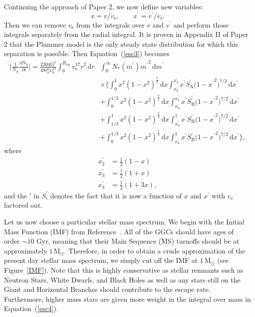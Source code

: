 \documentclass[aps,floatfix,prd,showpacs]{revtex4}
\newcommand{\diff}{\mathrm{d}}
\newcommand{\vesc}{v_{\text{e}}}
\newcommand{\vp}{v^\prime}
\newcommand{\mpr}{m^\prime}
\newcommand{\xp}{x^\prime}
\newcommand{\SA}{S_{\text{A}}}
\newcommand{\SB}{S_{\text{B}}}
\newcommand{\G}{\text{G}}
\newcommand{\Nx}{N_\chi}
\newcommand{\Rvir}{R_{\mathrm{vir}}}
\newcommand{\Msun}{\textrm{M}_\odot}
\begin{document}
Continuing the approach of Paper 2, we now define new variables: 
%
\begin{equation} 
x = v/\vesc, \qquad \xp = \vp/\vesc. 
\end{equation}
%
%
Then we can remove $\vesc$ from the integrals over $v$ and $\vp$ and perform those integrals separately from the radial integral. It is proven in Appendix II of Paper 2 that the Plummer model is the only steady state distribution for which this separation is possible. Then Equation~(\ref{esc3}) becomes
%
\begin{equation}
\label{esc4}
\begin{split}
\bigg|\frac{1}{\Nx}\frac{\partial \Nx}{\partial t}\bigg| = \frac{2304\G^2}{49 r_0^6\psi_0^{10}}\int^{\Rvir}_0{\vesc^{17}r^2}\,\diff r & \int^\infty_0{N_*(\mpr)\mpr}^2\,\diff \mpr \\& \times \Bigg\{ \int^1_0{x^2(1 - x^2)^\frac{7}{2}}\,\diff x\int^{\xp_3}_{\xp_2}{\xp \SA^\prime{(1-{\xp}^2})^{7/2}}\,\diff \xp \\
&+ \int^{1/3}_0{x^2(1 - x^2)^\frac{7}{2}}\,\diff x\int^{\xp_4}_{\xp_3} {\xp \SB^\prime{(1-{\xp}^2})^{7/2}}\,\diff \xp \\ &+ \int^1_{1/3}{x^2(1 - x^2)^\frac{7}{2}}\,\diff x\int^1_{x_3^\prime}{\xp \SB^\prime{(1-{\xp}^2})^{7/2}}\,\diff \xp \\
&+ \int^{1/3}_0{x^2(1 - {x}^2)^\frac{7}{2}}\,\diff x\int^1_{\xp_4}{\xp \SB^\prime{(1-{\xp}^2})^{7/2}}\,\diff \xp\Bigg\},
\end{split}
\end{equation}
%
%
where
%
\begin{equation}
\begin{split}
\xp_2 &= \frac{1}{2}(1 - x) \\
\xp_3 &= \frac{1}{2}(1 + x) \\
\xp_4 &= \frac{1}{2}(1 + 3x),
\end{split}
\end{equation}
%
%
and the $\prime$ in $S_i^\prime$ denotes the fact that it is now a function of $x$ and $\xp$ with $\vesc$ factored out.

Let us now choose a particular stellar mass spectrum. We begin with the Initial Mass Function (IMF) from Reference~\cite{Kroupa2001}. All of the GGCs should have ages of order $\sim10$ Gyr, meaning that their Main Sequence (MS) turnoffs should be at approximately $1\, \Msun$. Therefore, in order to obtain a crude approximation of the present day stellar mass spectrum, we simply cut off the IMF at $1\, \Msun$ (see Figure~\ref{IMF}). Note that this is highly conservative as stellar remnants such as Neutron Stars, White Dwarfs, and Black Holes as well as any stars still on the Giant and Horizontal Branches should contribute to the escape rate. Furthermore, higher mass stars are given more weight in the integral over mass in Equation~(\ref{esc4}).
\end{document}
